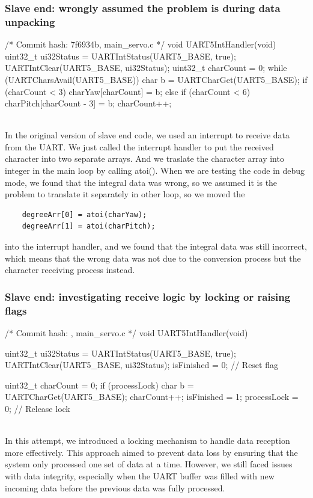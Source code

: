 \documentclass[12pt, a4paper]{article}
\begin{document}
\subsubsection{Slave end: wrongly assumed the problem is during data unpacking}\text{}
\begin{code}
/* Commit hash: 7f6934b, main_servo.c */
void UART5IntHandler(void) {
    uint32_t ui32Status = UARTIntStatus(UART5_BASE, true);
    UARTIntClear(UART5_BASE, ui32Status);
    uint32_t charCount = 0;
    while (UARTCharsAvail(UART5_BASE)) {
        char b = UARTCharGet(UART5_BASE);
        if (charCount < 3) {
            charYaw[charCount] = b;
        } else if (charCount < 6) {
            charPitch[charCount - 3] = b;
        }
        charCount++;
    }
}
\end{code}\text{}\\
In the original version of slave end code, we used an interrupt to receive data from the UART. 
We just called the interrupt handler to put the received character into two separate arrays. 
And we traslate the character array into integer in the main loop by calling atoi().
When we are testing the code in debug mode, we found that the integral data was wrong, 
so we assumed it is the problem to translate it separately in other loop, so we moved the 
\begin{verbatim}
    degreeArr[0] = atoi(charYaw);
    degreeArr[1] = atoi(charPitch);
\end{verbatim}
into the interrupt handler, and we found that the integral data was still incorrect, 
which means that the wrong data was not due to the conversion process but the character receiving process instead.

\subsubsection{Slave end: investigating receive logic by locking or raising flags}\text{}
\begin{code}
/* Commit hash: , main_servo.c */
void UART5IntHandler(void) {
    uint32_t ui32Status = UARTIntStatus(UART5_BASE, true);
    UARTIntClear(UART5_BASE, ui32Status);
    isFinished = 0; // Reset flag

    uint32_t charCount = 0;
    if (processLock) {
        char b = UARTCharGet(UART5_BASE);
        charCount++;
    }
    isFinished = 1;
    processLock = 0; // Release lock
}
\end{code}\text{}\\
In this attempt, we introduced a locking mechanism to handle data reception more effectively. 
This approach aimed to prevent data loss by ensuring that the system only processed one set of data 
at a time. However, we still faced issues with data integrity, especially when the UART buffer was 
filled with new incoming data before the previous data was fully processed.
\end{document}
